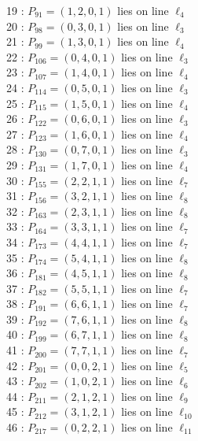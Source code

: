 \documentclass{article}
\begin{document}
{\begin{multicols}{2}
19 : $P_{91}=( 1, 2, 0, 1 )$ lies on line $\ell_{4}$\\
20 : $P_{98}=( 0, 3, 0, 1 )$ lies on line $\ell_{3}$\\
21 : $P_{99}=( 1, 3, 0, 1 )$ lies on line $\ell_{4}$\\
22 : $P_{106}=( 0, 4, 0, 1 )$ lies on line $\ell_{3}$\\
23 : $P_{107}=( 1, 4, 0, 1 )$ lies on line $\ell_{4}$\\
24 : $P_{114}=( 0, 5, 0, 1 )$ lies on line $\ell_{3}$\\
25 : $P_{115}=( 1, 5, 0, 1 )$ lies on line $\ell_{4}$\\
26 : $P_{122}=( 0, 6, 0, 1 )$ lies on line $\ell_{3}$\\
27 : $P_{123}=( 1, 6, 0, 1 )$ lies on line $\ell_{4}$\\
28 : $P_{130}=( 0, 7, 0, 1 )$ lies on line $\ell_{3}$\\
29 : $P_{131}=( 1, 7, 0, 1 )$ lies on line $\ell_{4}$\\
30 : $P_{155}=( 2, 2, 1, 1 )$ lies on line $\ell_{7}$\\
31 : $P_{156}=( 3, 2, 1, 1 )$ lies on line $\ell_{8}$\\
32 : $P_{163}=( 2, 3, 1, 1 )$ lies on line $\ell_{8}$\\
33 : $P_{164}=( 3, 3, 1, 1 )$ lies on line $\ell_{7}$\\
34 : $P_{173}=( 4, 4, 1, 1 )$ lies on line $\ell_{7}$\\
35 : $P_{174}=( 5, 4, 1, 1 )$ lies on line $\ell_{8}$\\
36 : $P_{181}=( 4, 5, 1, 1 )$ lies on line $\ell_{8}$\\
37 : $P_{182}=( 5, 5, 1, 1 )$ lies on line $\ell_{7}$\\
38 : $P_{191}=( 6, 6, 1, 1 )$ lies on line $\ell_{7}$\\
39 : $P_{192}=( 7, 6, 1, 1 )$ lies on line $\ell_{8}$\\
40 : $P_{199}=( 6, 7, 1, 1 )$ lies on line $\ell_{8}$\\
41 : $P_{200}=( 7, 7, 1, 1 )$ lies on line $\ell_{7}$\\
42 : $P_{201}=( 0, 0, 2, 1 )$ lies on line $\ell_{5}$\\
43 : $P_{202}=( 1, 0, 2, 1 )$ lies on line $\ell_{6}$\\
44 : $P_{211}=( 2, 1, 2, 1 )$ lies on line $\ell_{9}$\\
45 : $P_{212}=( 3, 1, 2, 1 )$ lies on line $\ell_{10}$\\
46 : $P_{217}=( 0, 2, 2, 1 )$ lies on line $\ell_{11}$\\

\end{multicols}}
\end{document}
